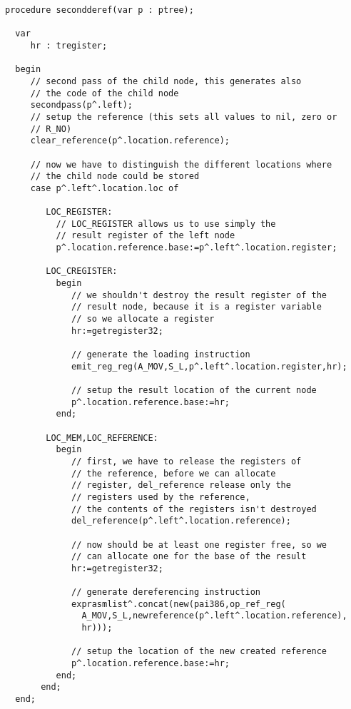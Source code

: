 \documentclass{report}
\begin{document}
\begin{verbatim}
procedure secondderef(var p : ptree);

  var
     hr : tregister;

  begin
     // second pass of the child node, this generates also
     // the code of the child node
     secondpass(p^.left);
     // setup the reference (this sets all values to nil, zero or
     // R_NO)
     clear_reference(p^.location.reference);

     // now we have to distinguish the different locations where
     // the child node could be stored
     case p^.left^.location.loc of

        LOC_REGISTER:
          // LOC_REGISTER allows us to use simply the
          // result register of the left node
          p^.location.reference.base:=p^.left^.location.register;

        LOC_CREGISTER:
          begin
             // we shouldn't destroy the result register of the
             // result node, because it is a register variable
             // so we allocate a register
             hr:=getregister32;

             // generate the loading instruction
             emit_reg_reg(A_MOV,S_L,p^.left^.location.register,hr);

             // setup the result location of the current node
             p^.location.reference.base:=hr;
          end;

        LOC_MEM,LOC_REFERENCE:
          begin
             // first, we have to release the registers of
             // the reference, before we can allocate
             // register, del_reference release only the
             // registers used by the reference,
             // the contents of the registers isn't destroyed
             del_reference(p^.left^.location.reference);

             // now should be at least one register free, so we
             // can allocate one for the base of the result
             hr:=getregister32;

             // generate dereferencing instruction
             exprasmlist^.concat(new(pai386,op_ref_reg(
               A_MOV,S_L,newreference(p^.left^.location.reference),
               hr)));

             // setup the location of the new created reference
             p^.location.reference.base:=hr;
          end;
       end;
  end;
\end{verbatim}
\end{document}
